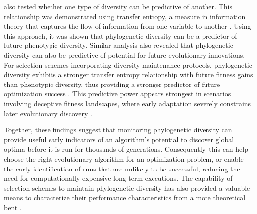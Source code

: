 \citet{hernandez2022can} also tested whether one type of diversity can be predictive of another.
This relationship was demonstrated using transfer entropy, a measure in information theory that captures the flow of information from one variable to another \citep{schreiber2000measuring}.
Using this approach, it was shown that phylogenetic diversity can be a predictor of future phenotypic diversity.
Similar analysis also revealed that phylogenetic diversity can also be predictive of potential for future evolutionary innovations.
For selection schemes incorporating diversity maintenance protocols, phylogenetic diversity exhibits a stronger transfer entropy relationship with future fitness gains than phenotypic diversity, thus providing a stronger predictor of future optimization success \citep{hernandez2022phylogenetic}.
This predictive power appears strongest in scenarios involving deceptive fitness landscapes, where early adaptation severely constrains later evolutionary discovery \citep{shahbandegan2022untangling}.

Together, these findings suggest that monitoring phylogenetic diversity can provide useful early indicators of an algorithm's potential to discover global optima before it is run for thousands of generations.
Consequently, this can help choose the right evolutionary algorithm for an optimization problem, or enable the early identification of runs that are unlikely to be successful, reducing the need for computationally expensive long-term executions.
The capability of selection schemes to maintain phylogenetic diversity has also provided a valuable means to characterize their performance characteristics from a more theoretical bent \citep{dolson2018ecological}.

